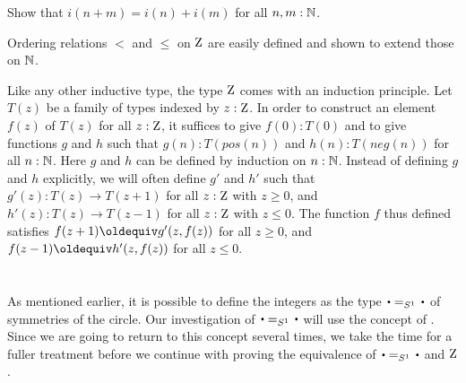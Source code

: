 \begin{xca}\label{xca:addition-on-Z-and-N}
Show that $i(n+m)=i(n)+i(m)$ for all $n,m:\mathbb{N}$.
\end{xca}

Ordering relations $<$ and $\leq$ on $\mathrm{Z}$ are easily defined
and shown to extend those on $\mathbb{N}$.

Like any other inductive type, the type $\mathrm{Z}$ comes with an
induction principle. Let $T(z)$ be a family of types indexed by $z:\mathrm{Z}$.
In order to construct an element $f(z)$ of $T(z)$ for all $z:\mathrm{Z}$,
it suffices to give $f(0): T(0)$ and to give functions $g$ and $h$ such
that $g(n): T(pos(n))$ and $h(n): T(neg(n))$ for all $n:\mathbb{N}$.
Here $g$ and $h$ can be defined by induction on $n:\mathbb{N}$.
Instead of defining $g$ and $h$ explicitly, we will often
define $g'$ and $h'$ such that $g'(z): T(z)\to T(z+1)$ 
for all $z:\mathrm{Z}$ with $z\geq 0$, and $h'(z): T(z)\to T(z-1)$ 
for all $z:\mathrm{Z}$ with $z\leq 0$. The function $f$ thus defined
satisfies $f(z+1)\jdeq g'(z,f(z))$ for all $z\geq 0$,
and $f(z-1)\jdeq h'(z,f(z))$ for all $z\leq 0$.


\section{\Coverings}
\label{sec:covering}

As mentioned earlier, it is possible to define the integers as the
type $\base=_{S^1}\base$ of symmetries of the circle.
Our investigation of $\base=_{S^1}\base$ will use the concept of \coverings.
Since we are going to return to this concept several times, 
we take the time for a fuller treatment before we continue with
proving the equivalence of $\base=_{S^1}\base$ and $\mathrm{Z}$.

